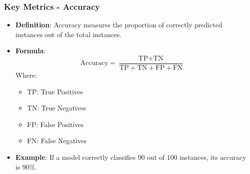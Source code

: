 \documentclass[aspectratio=169]{beamer}
\begin{document}
\begin{frame}[fragile]
    \frametitle{Key Metrics - Accuracy}
    \begin{itemize}
        \item \textbf{Definition}: Accuracy measures the proportion of correctly predicted instances out of the total instances.
        \item \textbf{Formula}:
        \begin{equation}
        \text{Accuracy} = \frac{\text{TP} + \text{TN}}{\text{TP} + \text{TN} + \text{FP} + \text{FN}}
        \end{equation}
        Where:
        \begin{itemize}
            \item TP: True Positives
            \item TN: True Negatives
            \item FP: False Positives
            \item FN: False Negatives
        \end{itemize}
        \item \textbf{Example}: If a model correctly classifies 90 out of 100 instances, its accuracy is \(90\%\).
    \end{itemize}
\end{frame}
\end{document}
